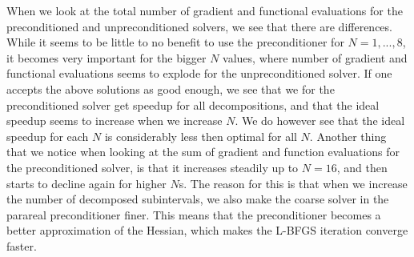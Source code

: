 When we look at the total number of gradient and functional evaluations for the preconditioned and unpreconditioned solvers, we see that there are differences. While it seems to be little to no benefit to use the preconditioner for $N=1,...,8$, it becomes very important for the bigger $N$ values, where number of gradient and functional evaluations seems to explode for the unpreconditioned solver. If one accepts the above solutions as good enough, we see that we for the preconditioned solver get speedup for all decompositions, and that the ideal speedup seems to increase when we increase $N$. We do however see that the ideal speedup for each $N$ is considerably less then optimal for all $N$. Another thing that we notice when looking at the sum of gradient and function evaluations for the preconditioned solver, is that it increases steadily up to $N=16$, and then starts to decline again for higher $N$s. The reason for this is that when we increase the number of decomposed subintervals, we also make the coarse solver in the parareal preconditioner finer. This means that the preconditioner becomes a better approximation of the Hessian, which makes the L-BFGS iteration converge faster.
